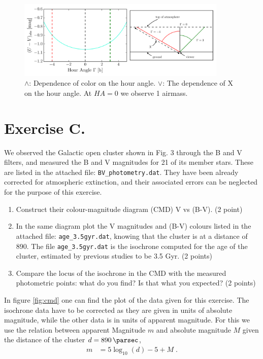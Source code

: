 \documentclass[11pt,a4paper,twoside]{article}
\newcommand{\op}[1]{\operatorname{#1}}
\begin{document}
\begin{figure}
\centering
\includegraphics[width=10cm]{pic/umv}
\caption{$\land$: Dependence of color on the hour angle. $\lor$: The dependence
         of X on the hour angle. At $HA = 0$ we observe 1 airmass.}
\label{fig:X}
\end{figure}


\section*{Exercise C.} 
We observed the Galactic open cluster shown in Fig. 3 through the B and V
filters, and measured the B and V magnitudes for 21 of its member stars. These 
are listed in the attached file: \verb+BV_photometry.dat+. They have been 
already corrected for atmospheric extinction, and their associated errors can 
be neglected for the purpose of this exercise.

\begin{enumerate}
\item Construct their colour-magnitude diagram (CMD) V vs (B-V). (2 point)
\item In the same diagram plot the V magnitudes and (B-V) colours listed in the 
attached file: \verb+age_3.5gyr.dat+, knowing that the cluster is at a distance
of \SI{890}{\parsec}. The file \verb+age_3.5gyr.dat+ is the isochrone computed for 
the age of the cluster, estimated by previous studies to be 3.5 Gyr. (2 points)
\item Compare the locus of the isochrone in the CMD with the measured 
photometric points: what do you find? Is that what you expected? (2 points)
\end{enumerate}

In figure \ref{fig:cmd} one can find the plot of the data given for this 
exercise. 
The isochrone data have to be corrected as they are given in units of absolute
magnitude, while the other data is in units of apparent magnitude. For this
we use the relation between apparent Magnitude $m$ and absolute magnitude $M$
given the distance of the cluster $d = \SI{890}{\parsec}$,
\begin{align}
    m &= 5\op{log}_{10}(d) - 5 + M \;.
\end{align}
\end{document}
